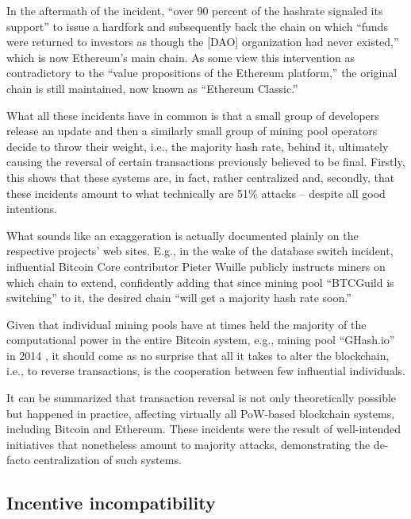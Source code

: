 In the aftermath of the incident, ``over 90 percent of the hashrate signaled its support'' to issue a hardfork and subsequently back the chain on which ``funds were returned to investors as though the [DAO] organization had never existed,'' which is now Ethereum's main chain. \autocite[76]{dhillon2017}
As some view this intervention as contradictory to the ``value propositions of the Ethereum platform,''  the original chain is still maintained, now known as ``Ethereum Classic.'' \autocite[76]{dhillon2017}

What all these incidents have in common is that a small group of developers release an update and then a similarly small group of mining pool operators decide to throw their weight, i.e., the majority hash rate, behind it, ultimately causing the reversal of certain transactions previously believed to be final.
Firstly, this shows that these systems are, in fact, rather centralized and, secondly, that these incidents amount to what technically are 51\% attacks -- despite all good intentions.

What sounds like an exaggeration is actually documented plainly on the respective projects' web sites.
E.g., in the wake of the database switch incident, influential Bitcoin Core contributor Pieter Wuille publicly instructs miners on which chain to extend, confidently adding that since mining pool ``BTCGuild is switching'' to it, the desired chain ``will get a majority hash rate soon.'' \autocite{bitcointalk2013databaseswitchincident}

Given that individual mining pools have at times held the majority of the computational power in the entire Bitcoin system, e.g., mining pool ``GHash.io'' in 2014 \autocite[222]{boehme2015}, it should come as no surprise that all it takes to alter the blockchain, i.e., to reverse transactions, is the cooperation between few influential individuals.

It can be summarized that transaction reversal is not only theoretically possible but happened in practice, affecting virtually all PoW-based blockchain systems, including Bitcoin and Ethereum.
These incidents were the result of well-intended initiatives that nonetheless amount to majority attacks, demonstrating the de-facto centralization of such systems.

\subsection{Incentive incompatibility}

